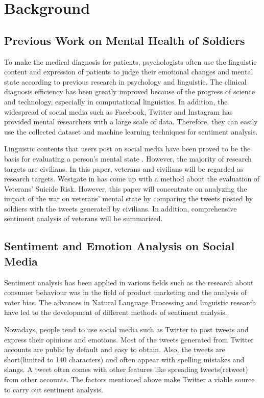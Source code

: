 \section{Background}

\subsection{Previous Work on Mental Health of Soldiers}

To make the medical diagnosis for patients, psychologists often use the linguistic content and expression of patients to judge their emotional changes and mental state according to previous research in psychology and linguistic. The clinical diagnosis efficiency has been greatly improved because of the progress of science and technology, especially in computational linguistics. In addition, the widespread of social media such as Facebook, Twitter and Instagram has provided mental researchers with a large scale of data. Therefore, they can easily use the collected dataset and machine learning techniques for sentiment analysis.

Linguistic contents that users post on social media have been proved to be the basis for evaluating a person's mental state \citep{becauseIwastoldsomuch} \citep{GUNTUKU201743}. However, the majority of research targets are civilians. In this paper, veterans and civilians will be regarded as research targets. Westgate in \citep{doi:10.1176/appi.ps.201400283} has come up with a method about the evaluation of Veterans’ Suicide Risk. However, this paper will concentrate on analyzing the impact of the war on veterans' mental state by comparing the tweets posted by soldiers with the tweets generated by civilians. In addition, comprehensive sentiment analysis of veterans will be summarized.

\subsection{Sentiment and Emotion Analysis on Social Media}

Sentiment analysis has been applied in various fields such as the research about consumer behaviour was in the field of product marketing and the analysis of voter bias. The advances in Natural Language Processing and linguistic research have led to the development of different methods of sentiment analysis.

Nowadays, people tend to use social media such as Twitter to post tweets and express their opinions and emotions. Most of the tweets generated from Twitter accounts are public by default and easy to obtain. Also, the tweets are short(limited to 140 characters) and often appear with spelling mistakes and slangs. A tweet often comes with other features like spreading tweets(retweet) from other accounts. The factors mentioned above make Twitter a viable source to carry out sentiment analysis.

